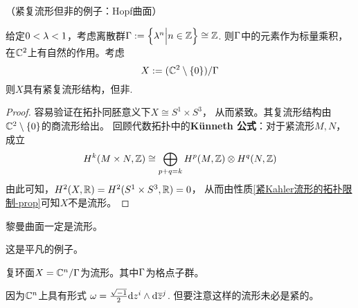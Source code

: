 
\begin{example}（紧复流形但非\Kahler 的例子：Hopf曲面）

给定$0<\lambda<1$，考虑离散群$\Gamma:=\Big\{ \lambda^n \Big| n\in\mathbb{Z} \Big\}\cong\mathbb{Z}$.
则$\Gamma$中的元素作为标量乘积，在$\mathbb{C}^2$上有自然的作用。考虑
$$X:=(\mathbb{C}^2\setminus\{0\})/\Gamma$$
则$X$具有紧复流形结构，但非\Kahler .
\end{example}

\begin{proof}
容易验证在拓扑同胚意义下$X\cong S^1\times S^3$，
从而紧致。其复流形结构由$\mathbb{C}^2\setminus\{0\}$的商流形给出。
回顾代数拓扑中的\textbf{K\"{u}nneth 公式}：对于紧流形$M,N$，成立
$$
  H^k(M\times N,\mathbb{Z})
\cong
  \bigoplus_{p+q=k}
  H^p(M,\mathbb{Z})\otimes H^q(N,\mathbb{Z})
$$
由此可知，$H^2(X,\mathbb{R})=H^2(S^1\times S^3,\mathbb{R})=0$，
从而由性质\ref{紧Kahler流形的拓扑限制-prop}可知$X$不是\Kahler 流形。
\end{proof}


\begin{example}
黎曼曲面一定是\Kahler 流形。
\end{example}

这是平凡的例子。

\begin{example}
复环面$X=\mathbb{C}^n/\Gamma$为\Kahler 流形。其中$\Gamma$为格点子群。
\end{example}
因为$\mathbb{C}^n$上具有\Kahler 形式
$\omega=\frac{\sqrt{-1}}{2}\mathrm{d} z^i\wedge\mathrm{d}\overline{z}^j$.
但要注意这样的流形未必是紧的。

